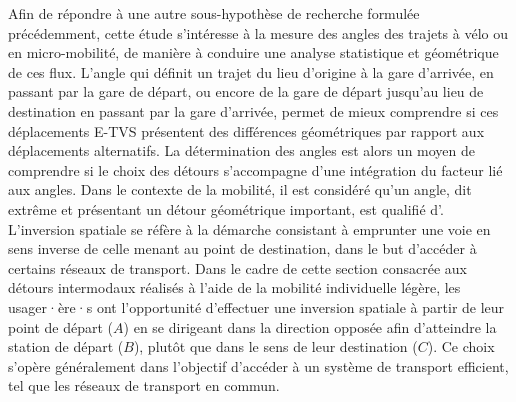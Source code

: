 \begin{refsegment}
Afin de répondre à une autre sous-hypothèse de recherche formulée précédemment, cette étude s'intéresse à la mesure des angles des trajets à vélo ou en micro-mobilité, de manière à conduire une analyse statistique et géométrique de ces flux. L'angle qui définit un trajet du lieu d'origine à la gare d'arrivée, en passant par la gare de départ, ou encore de la gare de départ jusqu'au lieu de destination en passant par la gare d'arrivée, permet de mieux comprendre si ces déplacements \acrshort{E-TVS} présentent des différences géométriques par rapport aux déplacements alternatifs. La détermination des angles est alors un moyen de comprendre si le choix des détours s'accompagne d'une intégration du facteur lié aux angles. Dans le contexte de la mobilité, il est considéré qu'un angle, dit extrême et présentant un détour géométrique important, est qualifié d'. L'inversion spatiale se réfère à la démarche consistant à emprunter une voie en sens inverse de celle menant au point de destination, dans le but d'accéder à certains réseaux de transport. Dans le cadre de cette section consacrée aux détours intermodaux réalisés à l'aide de la mobilité individuelle légère, les usager·ère·s ont l'opportunité d'effectuer une inversion spatiale à partir de leur point de départ (\(A\)) en se dirigeant dans la direction opposée afin d'atteindre la station de départ (\(B\)), plutôt que dans le sens de leur destination (\(C\)). Ce choix s'opère généralement dans l'objectif d'accéder à un système de transport efficient, tel que les réseaux de transport en commun.%


\end{refsegment}
